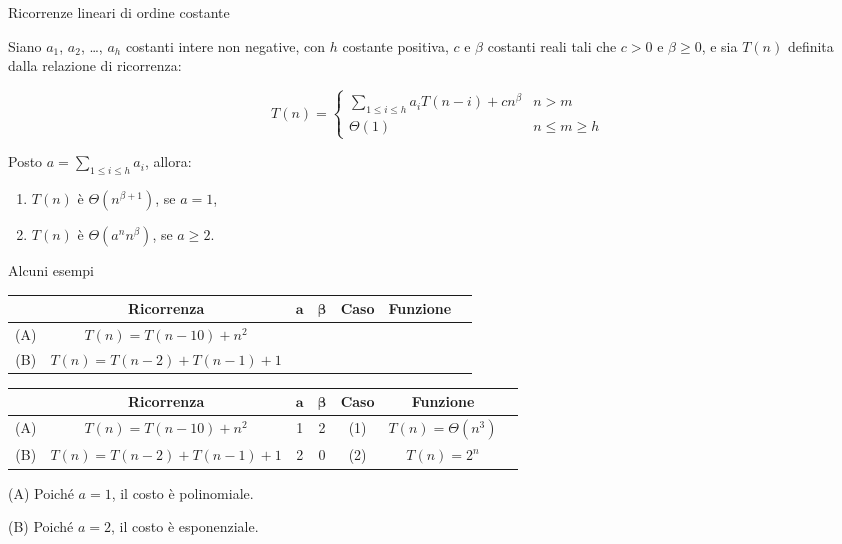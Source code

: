 \begin{frame}{Ricorrenze lineari di ordine costante}

\begin{myboxtitle}[Teorema]
Siano $a_1$, $a_2$, \ldots, $a_h$ costanti intere non negative, con $h$
costante positiva, $c$ e $\beta$ costanti reali tali che $c > 0$ e $\beta \ge
0$, e sia $T(n)$ definita dalla relazione di ricorrenza:

\[
T(n) = \begin{cases}
\sum_{1 \le i \le h} a_iT(n - i) + cn^\beta & n > m \\
\Theta(1) & n \le m \ge h
\end{cases}
\]

Posto $a = \displaystyle\sum_{1 \le i \le h}a_i$, allora:
\begin{enumerate}
\item $T(n)$ è $\Theta(n^{\beta+1})$, se $a = 1$,
\item $T(n)$ è $\Theta(a^nn^\beta)$, se $a \ge 2$.
\end{enumerate}

\end{myboxtitle}

\end{frame}


\begin{frame}[shrink=6]{Alcuni esempi}

\bgroup
\def\arraystretch{1.1}

\begin{overprint}


\begin{tabular}{|c|c|c|c|c|c|c|}
\hline
&\textbf{Ricorrenza} & $\mathbf{a}$ & $\mathbf{\beta}$ & \textbf{Caso} & \textbf{Funzione} \\
\hline
(A) & $T(n) = T(n-10)+n^2$ &  &  &  &  \\
\hline
(B) & $T(n) = T(n-2)+T(n-1)+1$ &  &  & &  \\
\hline
\end{tabular}


\begin{tabular}{|c|c|c|c|c|c|c|}
\hline
&\textbf{Ricorrenza} & $\mathbf{a}$ & $\mathbf{\beta}$ & \textbf{Caso} & \textbf{Funzione} \\
\hline
(A) & $T(n) = T(n-10)+n^2$ & 1 & 2 & (1) & $T(n) = \Theta(n^3)$ \\
\hline
(B) & $T(n) = T(n-2)+T(n-1)+1$ & 2 & 0 & (2) & $T(n) = 2^n$ \\
\hline
\end{tabular}

\end{overprint}

\egroup

\begin{mybox}
\BIL
\item[(A)] Poiché $a=1$, il costo è polinomiale.
\item[(B)] Poiché $a=2$, il costo è esponenziale.
\EIL
\end{mybox}

\end{frame}

